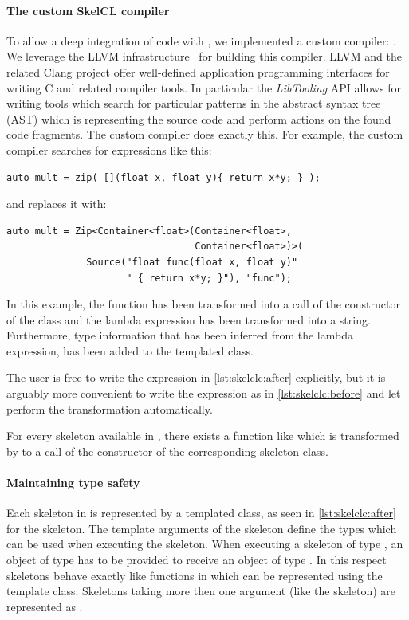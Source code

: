 \paragraph{The custom SkelCL compiler}
To allow a deep integration of \SkelCL code with \Cpp, we implemented a custom compiler: .
We leverage the LLVM infrastructure~\cite{Lattner2004} for building this compiler.
LLVM and the related Clang project offer well-defined application programming interfaces for writing C and \Cpp related compiler tools.
In particular the \emph{LibTooling} API allows for writing tools which search for particular patterns in the abstract syntax tree (AST) which is representing the source code and perform actions on the found code fragments.
The  custom compiler does exactly this.
For example, the custom compiler searches for expressions like this:
\begin{lstlisting}[numbers=none,label={lst:skelclc:before},caption={\SkelCL code snippet before transformation.}]
auto mult = zip( [](float x, float y){ return x*y; } );
\end{lstlisting}
and replaces it with:
\begin{lstlisting}[numbers=none,label={lst:skelclc:after},caption={\SkelCL code snippet after transformation.}]
auto mult = Zip<Container<float>(Container<float>,
                                 Container<float>)>(
              Source("float func(float x, float y)"
                     " { return x*y; }"), "func");
\end{lstlisting}

In this example, the  function has been transformed into a call of the constructor of the  class and the lambda expression has been transformed into a string.
Furthermore, type information that has been inferred from the lambda expression, has been added to the templated  class.

The user is free to write the expression in \autoref{lst:skelclc:after} explicitly, but it is arguably more convenient to write the expression as in \autoref{lst:skelclc:before} and let  perform the transformation automatically.

For every skeleton available in \SkelCL, there exists a function like  which is transformed by  to a call of the constructor of the corresponding skeleton class.

\paragraph{Maintaining type safety}
Each skeleton in \SkelCL is represented by a templated class, as seen in \autoref{lst:skelclc:after} for the \zip skeleton.
The template arguments of the skeleton define the types which can be used when executing the skeleton.
When executing a skeleton of type , an object of type  has to be provided to receive an object of type .
In this respect skeletons behave exactly like functions in \Cpp which can be represented using the  template class.
Skeletons taking more then one argument (like the  skeleton) are represented as .%


